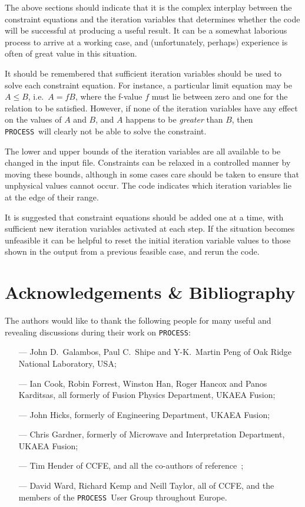 \documentclass[11pt,a4paper]{report}
\newcommand{\process}{\mbox{\texttt{PROCESS}}}
\newcommand{\setheader}[1]
 {\markright{\rlap{\lower0.8ex\hbox to\textwidth{\hrulefill}}{\bf#1}}}
\newcommand{\mychapter}[1]{\small\normalsize
 \setcounter{footnote}{0}
 \chapter{#1}
 \pagestyle{myheadings}
 \setheader{Chapter \thechapter\hspace{0.8em}#1}}
\begin{document}
The above sections should indicate that it is the complex interplay between
the constraint equations and the iteration variables that determines whether
the code will be successful at producing a useful result. It can be a somewhat
laborious process to arrive at a working case, and (unfortunately, perhaps)
experience is often of great value in this situation.

It should be remembered that sufficient iteration variables should be used to
solve each constraint equation. For instance, a particular limit equation may
be $A \leq B$, i.e.\ $A = fB$, where the f-value $f$ must lie between zero and
one for the relation to be satisfied.  However, if none of the iteration
variables have any effect on the values of $A$ and $B$, and $A$ happens to be
\textit{greater}\/ than $B$, then \process\ will clearly not be able to solve
the constraint.

The lower and upper bounds of the iteration variables are all available to be
changed in the input file. Constraints can be relaxed in a controlled manner
by moving these bounds, although in some cases care should be taken to ensure
that unphysical values cannot occur.  The code indicates which iteration
variables lie at the edge of their range.

It is suggested that constraint equations should be added one at a time, with
sufficient new iteration variables activated at each step.  If the situation
becomes unfeasible it can be helpful to reset the initial iteration variable
values to those shown in the output from a previous feasible case, and rerun
the code.

\mychapter{Acknowledgements \& Bibliography}
\label{chap:acks}

The authors would like to thank the following people for many useful
and revealing discussions during their work on \process:

\begin{itemize}
\item[---]
John D.\ Galambos, Paul C.\ Shipe and Y-K.\ Martin Peng of Oak Ridge
National Laboratory, USA;
\item[---]
Ian Cook, Robin Forrest, Winston Han, Roger Hancox and Panos Karditsas, all formerly of
Fusion Physics Department, UKAEA Fusion;
\item[---]
John Hicks, formerly of Engineering Department, UKAEA Fusion;
\item[---]
Chris Gardner, formerly of Microwave and Interpretation Department, UKAEA
Fusion;
\item[---]
Tim Hender of CCFE, and all the co-authors of reference~\cite{172};
\item[---]
David Ward, Richard Kemp and Neill Taylor, all of
CCFE, and the members of the \process\ User Group throughout Europe.
\end{itemize}
\end{document}

